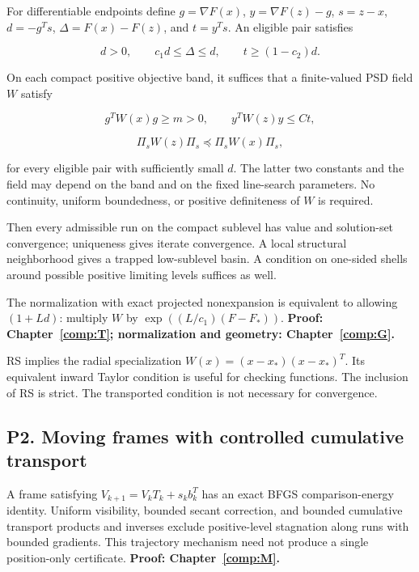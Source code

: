 For differentiable endpoints define \(g=\nabla F(x)\), \(y=\nabla F(z)-g\), \(s=z-x\), \(d=-g^Ts\), \(\Delta=F(x)-F(z)\), and \(t=y^Ts\). An eligible pair satisfies

\[d>0,\qquad c_1d\le\Delta\le d,\qquad t\ge(1-c_2)d.\]

On each compact positive objective band, it suffices that a finite-valued PSD field \(W\) satisfy

\[g^TW(x)g\ge m>0,\qquad y^TW(z)y\le Ct,\]

\[\Pi_sW(z)\Pi_s\preceq\Pi_sW(x)\Pi_s,\]

for every eligible pair with sufficiently small \(d\). The latter two constants and the field may depend on the band and on the fixed line-search parameters. No continuity, uniform boundedness, or positive definiteness of \(W\) is required.

Then every admissible run on the compact sublevel has value and solution-set convergence; uniqueness gives iterate convergence. A local structural neighborhood gives a trapped low-sublevel basin. A condition on one-sided shells around possible positive limiting levels suffices as well.

The normalization with exact projected nonexpansion is equivalent to allowing \((1+Ld)\): multiply \(W\) by \(\exp((L/c_1)(F-F_*))\). \textbf{Proof: Chapter~\ref{comp:T}; normalization and geometry: Chapter~\ref{comp:G}.}

RS implies the radial specialization \(W(x)=(x-x_*)(x-x_*)^T\). Its equivalent inward Taylor condition is useful for checking functions. The inclusion of RS is strict. The transported condition is not necessary for convergence.



\subsection{P2. Moving frames with controlled cumulative transport}\label{p2.-moving-frames-with-controlled-cumulative-transport}

A frame satisfying \(V_{k+1}=V_kT_k+s_kb_k^T\) has an exact BFGS comparison-energy identity. Uniform visibility, bounded secant correction, and bounded cumulative transport products and inverses exclude positive-level stagnation along runs with bounded gradients. This trajectory mechanism need not produce a single position-only certificate. \textbf{Proof: Chapter~\ref{comp:M}.}



